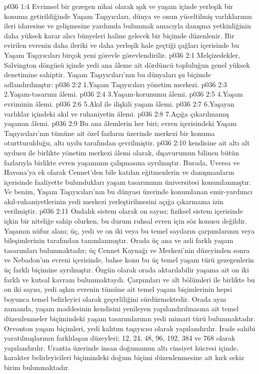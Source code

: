 \vs p036 1:4 Evrimsel bir gezegen nihai olarak ışık ve yaşam içinde yerleşik bir konuma getirildiğinde Yaşam Taşıyıcıları, dünya ve onun yüceltilmiş varlıklarının ileri idaresine ve gelişmesine yardımda bulunmak amacıyla danışma yetkinliğinin daha yüksek karar alıcı bünyeleri haline gelecek bir biçimde düzenlenir. Bir evirilen evrenin daha ileriki ve daha yerleşik hale geçtiği çağları içerisinde bu Yaşam Taşıyıcıları birçok yeni görevle görevlendirilir.
\vs p036 2:1 Melçizedekler, Salvington döngüsü içinde yedi ana âleme ait dördüncü topluluğun genel yüksek denetimine sahiptir. Yaşam Taşıyıcıları’nın bu dünyaları şu biçimde adlandırılmıştır:
\vs p036 2:2 1.\bibnobreakspace Yaşam Taşıyıcıları yönetim merkezi.
\vs p036 2:3 2.\bibnobreakspace Yaşam\hyp{}tasarımı âlemi.
\vs p036 2:4 3.\bibnobreakspace Yaşam\hyp{}korunumu âlemi.
\vs p036 2:5 4.\bibnobreakspace Yaşam evriminin âlemi.
\vs p036 2:6 5.\bibnobreakspace Akıl ile ilişkili yaşam âlemi.
\vs p036 2:7 6.\bibnobreakspace Yaşayan varlıklar içindeki akıl ve ruhaniyetin âlemi.
\vs p036 2:8 7.\bibnobreakspace Açığa çıkarılmamış yaşamın âlemi.
\vs p036 2:9 Bu ana âlemlerin her biri; evren içerisindeki Yaşam Taşıyıcıları’nın tümüne ait özel fazların üzerinde merkezi bir konuma oturtturulduğu, altı uydu tarafından çevrilmiştir.
\vs p036 2:10  kendisine ait altı alt uydusu ile birlikte yönetim merkezi âlemi olarak, dışavurumun bilinen bütün fazlarıyla birlikte evren yaşamının çalışmasına ayrılmıştır. Burada, Uversa ve Havona’ya ek olarak Cennet’den bile katılan eğitmenlerin ve danışmanların içerisinde faaliyette bulundukları yaşam tasarımının üniversitesi konumlanmıştır. Ve benim, Yaşam Taşıyıcıları’nın bu dünyası üzerinde konumlanan emir\hyp{}yardımcı akıl\hyp{}ruhaniyetlerinin yedi merkezi yerleştirilmesini açığa çıkarmama izin verilmiştir.
\vs p036 2:11 Ondalık sistem olarak on sayısı; fiziksel sistem içerisinde içkin bir niteliğe sahip olurken, bu durum ruhsal evren için söz konusu değildir. Yaşamın nüfuz alanı; üç, yedi ve on iki veya bu temel sayıların çarpımlarının veya bileşimlerinin tarafından tanımlanmıştır. Orada üç ana ve asli farklı yaşam tasarımları bulunmaktadır; üç Cennet Kaynağı ve Merkezi’nin düzeyinden sonra ve Nebadon’un evreni içerisinde, bahse konu bu üç temel yaşam türü gezegenlerin üç farklı biçimine ayrılmıştır. Özgün olarak orada aktarılabilir yaşama ait on iki farklı ve kutsal kavram bulunmaktaydı. Çarpımları ve alt bölümleri ile birlikte bu on iki sayısı, yedi aşkın evrenin tümüne ait temel yaşam biçimlerinin hepsi boyunca temel belirleyici olarak geçerliliğini sürdürmektedir. Orada aynı zamanda, yaşam maddesinin kendisini yenileyen yapılandırılmasına ait temel düzenlenmeler biçimindeki yaşam tasarımlarının yedi mimari türü bulunmaktadır. Orvonton yaşam biçimleri, yedi kalıtım taşıyıcısı olarak yapılandırılır. İrade sahibi yaratılmışlarının farklılaşan düzeyleri; 12, 24, 48, 96, 192, 384 ve 768 olarak yapılandırılır. Urantia üzerinde insan doğumunun altı cinsiyet hücresi içinde, karakter belirleyicileri biçimindeki doğum biçimi düzenlenmesine ait kırk sekiz birim bulunmaktadır.
